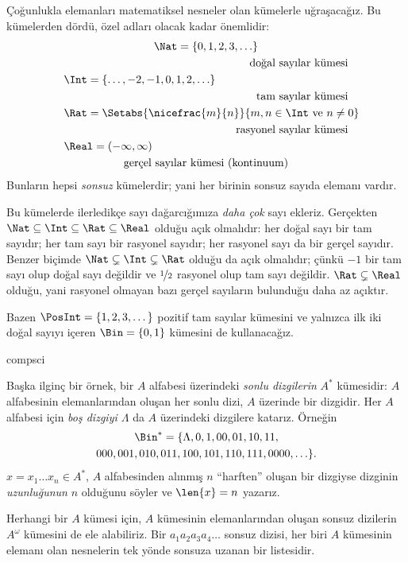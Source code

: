


\begin{ex}
Çoğunlukla elemanları matematiksel nesneler olan kümelerle
uğraşacağız. Bu kümelerden dördü, özel adları olacak kadar önemlidir:
\begin{multline*}
    \Nat = \{0, 1, 2, 3, \ldots\} \\
    \shoveright{\text{doğal sayılar kümesi}}\\
    \shoveleft{\Int = \{\ldots, -2, -1, 0, 1, 2, \ldots\}} \\
    \shoveright{\text{tam sayılar kümesi}}\\
    \shoveleft{\Rat = \Setabs{\nicefrac{m}{n}}{m, n \in \Int\text{ ve }n \neq 0}}\\
    \shoveright{\text{rasyonel sayılar kümesi}}\\
    \shoveleft{\Real = (-\infty, \infty)}\\
    \text{gerçel sayılar kümesi (kontinuum)}
\end{multline*}
Bunların hepsi \emph{sonsuz} kümelerdir; yani her birinin sonsuz sayıda
elemanı vardır.

Bu kümelerde ilerledikçe sayı dağarcığımıza \emph{daha çok} sayı ekleriz.
Gerçekten $\Nat \subseteq \Int \subseteq \Rat \subseteq \Real$ olduğu açık
olmalıdır: her doğal sayı bir tam sayıdır; her tam sayı bir rasyonel sayıdır;
her rasyonel sayı da bir gerçel sayıdır. Benzer biçimde
$\Nat \subsetneq \Int \subsetneq \Rat$ olduğu da açık olmalıdır; çünkü $-1$
bir tam sayı olup doğal sayı değildir ve $\nicefrac{1}{2}$ rasyonel olup tam
sayı değildir. $\Rat \subsetneq \Real$ olduğu, yani rasyonel olmayan bazı
gerçel sayıların bulunduğu daha az açıktır.

Bazen $\PosInt = \{1, 2, 3, \dots\}$ pozitif tam sayılar kümesini ve yalnızca
ilk iki doğal sayıyı içeren $\Bin = \{0, 1\}$ kümesini de kullanacağız.
\end{ex}

\begin{tagblock}{compsci}
\begin{ex}[Dizgiler]
Başka ilginç bir örnek, bir $A$ alfabesi üzerindeki \emph{sonlu dizgilerin}
$A^{*}$ kümesidir: $A$ alfabesinin elemanlarından oluşan her sonlu dizi, $A$ üzerinde
bir dizgidir. Her $A$ alfabesi için \emph{boş dizgiyi $\Lambda$} da $A$
üzerindeki dizgilere katarız. Örneğin
\begin{multline*}
\Bin^*
=\{\Lambda,0,1,00,01,10,11,\\
000,001,010,011,100,101,110,111,0000,\ldots\}.
\end{multline*}
$x=x_{1}\ldots x_{n}\in A^{*}$, $A$ alfabesinden alınmış $n$ ``harften'' oluşan bir
dizgiyse dizginin \emph{uzunluğunun} $n$ olduğunu söyler ve $\len{x}=n$
yazarız.
\end{ex}
\end{tagblock}

\begin{ex}
Herhangi bir $A$ kümesi için, $A$ kümesinin elemanlarından oluşan
sonsuz dizilerin $A^\omega$ kümesini de ele alabiliriz. Bir
$a_1a_2a_3a_4\dots$ sonsuz dizisi, her biri $A$ kümesinin elemanı olan
nesnelerin tek yönde sonsuza uzanan bir listesidir.
\end{ex}


